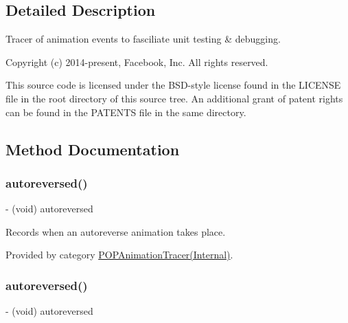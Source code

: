 \subsection{Detailed Description}
Tracer of animation events to fasciliate unit testing \& debugging.

Copyright (c) 2014-\/present, Facebook, Inc. All rights reserved.

This source code is licensed under the B\+S\+D-\/style license found in the L\+I\+C\+E\+N\+SE file in the root directory of this source tree. An additional grant of patent rights can be found in the P\+A\+T\+E\+N\+TS file in the same directory. 

\subsection{Method Documentation}
\mbox{\label{interface_p_o_p_animation_tracer_a641c94b868612f3d5b92b24cc4098517}} 
\subsubsection{\texorpdfstring{autoreversed()}{autoreversed()}\hspace{0.1cm}{\footnotesize\ttfamily [1/2]}}
{\footnotesize\ttfamily -\/ (void) autoreversed \begin{DoxyParamCaption}{ }\end{DoxyParamCaption}}

Records when an autoreverse animation takes place. 

Provided by category \mbox{\hyperlink{category_p_o_p_animation_tracer_07_internal_08_a641c94b868612f3d5b92b24cc4098517}{P\+O\+P\+Animation\+Tracer(\+Internal)}}.

\mbox{\label{interface_p_o_p_animation_tracer_a641c94b868612f3d5b92b24cc4098517}} 
\subsubsection{\texorpdfstring{autoreversed()}{autoreversed()}\hspace{0.1cm}{\footnotesize\ttfamily [2/2]}}
{\footnotesize\ttfamily -\/ (void) autoreversed \begin{DoxyParamCaption}{ }\end{DoxyParamCaption}}

